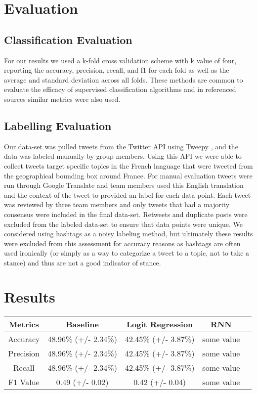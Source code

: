 \documentclass[journal]{IEEEtran}
\begin{document}
\pagebreak


\section{Evaluation}

\subsection{Classification Evaluation}
For our results we used a k-fold cross validation scheme with k value of four, reporting the accuracy, precision, recall, and f1 for each fold as well as the average and standard deviation across all folds. These methods are common to evaluate the efficacy of supervised classification algorithms and in referenced sources similar metrics were also used. 

\subsection{Labelling Evaluation}
Our data-set was pulled tweets from the Twitter API \cite{Twitter_API} using Tweepy \cite{tweepy}, and the data was labeled manually by group members. Using this API we were able to collect tweets target specific topics in the French language that were tweeted from the geographical bounding box around France. For manual evaluation tweets were run through Google Translate and team members used this English translation and the context of the tweet to provided an label for each data point. Each tweet was reviewed by three team members and only tweets that had a majority consensus were included in the final data-set. Retweets and duplicate posts were excluded from the labeled data-set to ensure that data points were unique. We considered using hashtags as a noisy labeling method, but ultimately these results were excluded from this assessment for accuracy reasons as hashtags are often used ironically (or simply as a way to categorize a tweet to a topic, not to take a stance) and thus are not a good indicator of stance. 







\section{Results}

\begin{center}
\begin{tabular}{ | c | c | c | c | c |}
\hline
Metrics & Baseline & Logit Regression & RNN\\[0.7ex]
\hline
Accuracy & 48.96\% (+/- 2.34\%) & 42.45\% (+/- 3.87\%) & some value\\
Precision & 48.96\% (+/- 2.34\%)  & 42.45\% (+/- 3.87\%) & some value\\
Recall & 48.96\% (+/- 2.34\%)  & 42.45\% (+/- 3.87\%) & some value\\
F1 Value & 0.49 (+/- 0.02) & 0.42 (+/- 0.04) & some value\\ [1ex]
\hline
\end{tabular}
\end{center}
\end{document}
